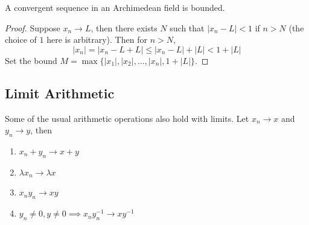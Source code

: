 \documentclass[10pt]{report}
\begin{document}
\begin{prop}
	A convergent sequence in an Archimedean field is bounded.
\end{prop}
\begin{proof}
	Suppose $x_n \to L$, then there exists $N$ such that $|x_n-L| < 1$ if  $n > N$ (the choice of $1$ here is arbitrary). Then for $n > N$,
	\[
	|x_n| = |x_n - L + L| \leq |x_n-L| + |L| < 1 + |L|
	\]
	Set the bound $M = \max\{|x_1|, |x_2|, \dots, |x_n|, 1 + |L|\}$.
\end{proof}

\subsection{Limit Arithmetic}

\begin{prop}
Some of the usual arithmetic operations also hold with limits. Let $x_n \to x$ and $y_n \to y$, then
\begin{enumerate}
	\item $x_n + y_n \to x+y$
	\item $\lambda x_n \to \lambda x$
	\item $x_n y_n \to xy$ 
	\item $y_n \neq 0, y \neq 0 \implies x_n y_n^{-1} \to xy^{-1}$
\end{enumerate}
\end{prop}
\end{document}
